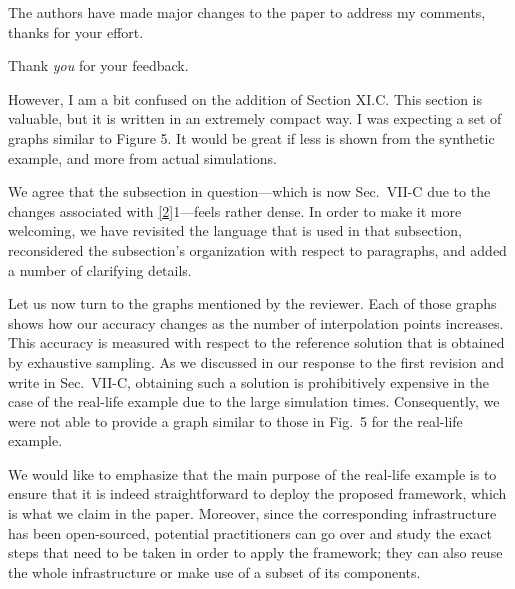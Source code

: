 \begin{reviewer}
The authors have made major changes to the paper to address my comments, thanks
for your effort.
\end{reviewer}

\begin{authors}
Thank \emph{you} for your feedback.
\end{authors}

\begin{reviewer}
However, I am a bit confused on the addition of Section XI.C. This section is
valuable, but it is written in an extremely compact way. I was expecting a set
of graphs similar to Figure 5. It would be great if less is shown from the
synthetic example, and more from actual simulations.
\end{reviewer}

\begin{authors}
We agree that the subsection in question---which is now Sec.~VII-C due to the
changes associated with \cref{2}{1}---feels rather dense. In order to make it
more welcoming, we have revisited the language that is used in that subsection,
reconsidered the subsection's organization with respect to paragraphs, and added
a number of clarifying details.

Let us now turn to the graphs mentioned by the reviewer. Each of those graphs
shows how our accuracy changes as the number of interpolation points increases.
This accuracy is measured with respect to the reference solution that is
obtained by exhaustive sampling. As we discussed in our response to the first
revision and write in Sec.~VII-C, obtaining such a solution is prohibitively
expensive in the case of the real-life example due to the large simulation
times. Consequently, we were not able to provide a graph similar to those in
Fig.~5 for the real-life example.

We would like to emphasize that the main purpose of the real-life example is to
ensure that it is indeed straightforward to deploy the proposed framework, which
is what we claim in the paper. Moreover, since the corresponding infrastructure
has been open-sourced, potential practitioners can go over and study the exact
steps that need to be taken in order to apply the framework; they can also reuse
the whole infrastructure or make use of a subset of its components.

\begin{actions}
\end{actions}
\end{authors}

